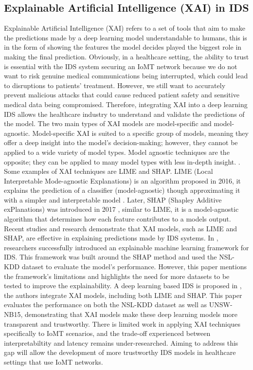 \documentclass[11pt,a4paper]{article}
\begin{document}
\subsection{Explainable Artificial Intelligence (XAI) in IDS}
Explainable Artificial Intelligence (XAI) refers to a set of tools that aim to make the predictions made by a deep learning model understandable to humans, this is in the form of showing the features the model decides played the biggest role in making the final prediction. Obviously, in a healthcare setting, the ability to trust is essential with the IDS system securing an IoMT network because we do not want to risk genuine medical communications being interrupted, which could lead to disruptions to patients' treatment. However, we still want to accurately prevent malicious attacks that could cause reduced patient safety and sensitive medical data being compromised. Therefore, integrating XAI into a deep learning IDS allows the healthcare industry to understand and validate the predictions of the model.
The two main types of XAI models are model-specific and model-agnostic. Model-specific XAI is suited to a specific group of models, meaning they offer a deep insight into the model's decision-making; however, they cannot be applied to a wide variety of model types. Model agnostic techniques are the opposite; they can be applied to many model types with less in-depth insight. \cite{devireddy2025comparative}.
Some examples of XAI techniques are LIME and SHAP. LIME (Local Interpretable Mode-agnostic Explanations) is an algorithm proposed in 2016, it explains the prediction of a classifier (model-agnostic) though approximating it with a simpler and interpretable model \cite{ribeiro2016should}. Later, SHAP (Shapley Additive exPlanations) was introduced in 2017 \cite{lundberg2017unified}, similar to LIME, it is a model-agnostic algorithm that determines how each feature contributes to a models output.
Recent studies and research demonstrate that XAI models, such as LIME and SHAP, are effective in explaining predictions made by IDS systems.
In \cite{wang2020explainable}, researchers successfully introduced an explainable machine learning framework for IDS. This framework was built around the SHAP method and used the NSL-KDD dataset \cite{5356528} to evaluate the model's performance. However, this paper mentions the framework's limitations and highlights the need for more datasets to be tested to improve the explainability.
A deep learning based IDS is proposed in \cite{SHARMA2024121751}, the authors integrate XAI models, including both LIME and SHAP. This paper evaluates the performance on both the NSL-KDD dataset as well as UNSW-NB15, demonstrating that XAI models make these deep learning models more transparent and trustworthy.
There is limited work in applying XAI techniques specifically to IoMT scenarios, and the trade-off experienced between interpretabiltity and latency remains under-researched. Aiming to address this gap will allow the development of more trustworthy IDS models in healthcare settings that use IoMT networks.
\end{document}

